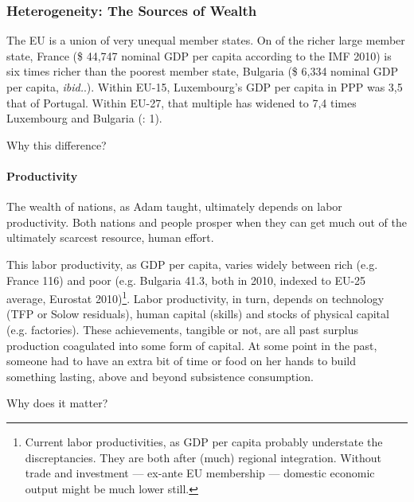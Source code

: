 \documentclass[11pt,a4paper,oneside,openright]{article}
\begin{document}
\subsubsection[Heterogeneity]{Heterogeneity: The Sources of Wealth} \label{sec:sources_of_wealth} The \gls{EU} is a union of very unequal member states. 
On of the richer large member state, France (\$ 44,747 nominal \gls{GDP} per capita according to the IMF 2010) is six times richer than the poorest member state, Bulgaria (\$ 6,334 nominal \gls{GDP} per capita, \emph{ibid.}.). 
Within \gls{EU}-15, Luxembourg's \gls{GDP} per capita in \gls{PPP} was 3,5 that of Portugal. 
Within \gls{EU}-27, that multiple has widened to 7,4 times Luxembourg and Bulgaria (\citealt{Alber2008}: 1). %

Why this difference?

\paragraph{Productivity} The wealth of nations, as Adam \cite{Smith-1776-lq} taught, ultimately depends on labor productivity. 
Both nations and people prosper when they can get much out of the ultimately scarcest resource, human effort. 

This labor productivity, as \gls{GDP} per capita, varies widely between rich (e.g. France 116) and poor (e.g. Bulgaria 41.3, both in 2010, indexed to EU-25 average, Eurostat 2010)\footnote{
	Current labor productivities, as \gls{GDP} per capita probably understate the discreptancies. They are both after (much) regional integration. 
	Without trade and investment --- ex-ante EU membership --- domestic economic output might be much lower still.}. 
Labor productivity, in turn, depends on technology (\gls{TFP} or Solow residuals), human capital (skills) and stocks of physical capital (e.g. factories). 
These achievements, tangible or not, are all past surplus production coagulated into some form of capital. 
At some point in the past, someone had to have an extra bit of time or food on her hands to build something lasting, above and beyond subsistence consumption.

Why does it matter?
\end{document}
